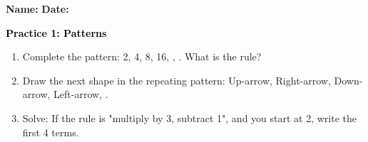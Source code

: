 \documentclass[12pt, letterpaper, fleqn]{article}
\newcommand{\blank}{\underline{\hspace{2.2cm}}}
\begin{document}
\textbf{Name:} \underline{\hspace{5cm}}
\hfill
\textbf{Date:} \underline{\hspace{3cm}}\\

\begin{tcolorbox}[colback=customteal!20]
    \large\textcolor{black}{\textbf{Practice 1: Patterns}}
\end{tcolorbox}
\begin{enumerate}[itemsep=3.5cm, leftmargin=0.6cm]
\item Complete the pattern: 2, 4, 8, 16, \blank, \blank. What is the rule?
\vspace{3cm}
\item Draw the next shape in the repeating pattern: Up-arrow, Right-arrow, Down-arrow, Left-arrow, \blank.
\vspace{3cm}
\item Solve: If the rule is "multiply by 3, subtract 1", and you start at 2, write the first 4 terms.
\end{enumerate}
\end{document}
